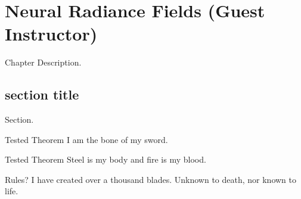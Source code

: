 \chapter{Neural Radiance Fields (Guest Instructor)}
Chapter Description.
\section{section title}
Section.
\begin{ln-theorem}{Tested Theorem}{}
    I am the bone of my sword.
\end{ln-theorem}
\begin{ln-define}{Tested Theorem}{}
    Steel is my body and fire is my blood.
\end{ln-define}
\begin{ln-quest}{Rules?}{}
    I have created over a thousand blades.
    \tcblower
    Unknown to death, nor known to life.
\end{ln-quest}